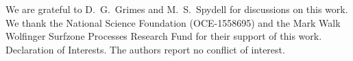 \documentclass{jfm}
\begin{document}
\begin{acknowledgements}
We are grateful to D.~G.~Grimes and M.~S.~Spydell for discussions on
this work.
We thank the National Science Foundation (OCE-1558695) and the Mark Walk
Wolfinger Surfzone Processes Research Fund for their support of this
work.
Declaration of Interests. The authors report no conflict of interest.
\end{acknowledgements}

\appendix



\end{document}
